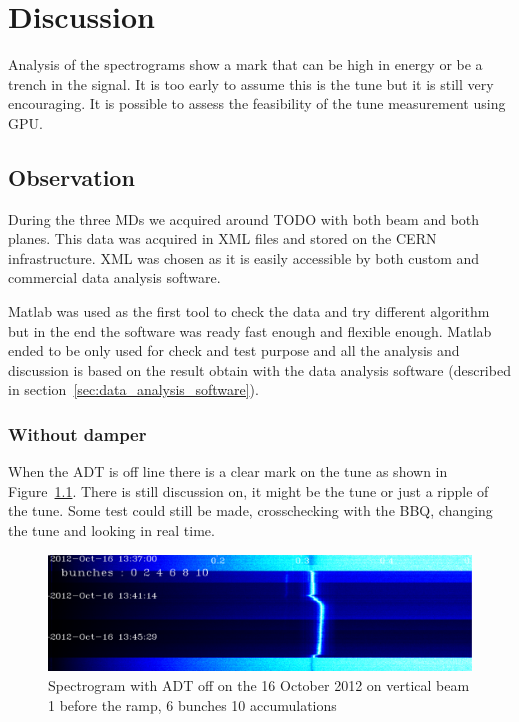 
\chapter{Discussion}

Analysis of the spectrograms show a mark that can be high in energy or be a trench in the signal. It is too early to assume this is the \gls{tune} but it is still very encouraging. It is possible to assess the feasibility of the tune measurement using \gls{GPU}.

\section{Observation}

During the three \glspl{MD} we acquired around TODO with both beam and both planes. This data was acquired in XML files and stored on the \gls{CERN} infrastructure. XML was chosen as it is easily accessible by both custom and commercial data analysis software.

Matlab was used as the first tool to check the data and try different algorithm but in the end the software was ready fast enough and flexible enough. Matlab ended to be only used for check and test purpose and all the analysis and discussion is based on the result obtain with the data analysis software (described in section~\ref{sec:data_analysis_software}).

\subsection{Without damper}

When the \gls{ADT} is off line there is a clear mark on the tune as shown in Figure~\ref{fig:adt_off}. There is still discussion on, it might be the tune or just a ripple of the tune. Some test could still be made, crosschecking with the \gls{BBQ}, changing the tune and looking in real time.

\begin{figure}[H]
\caption{Spectrogram with ADT off on the 16 October 2012 on vertical beam 1 before the ramp, 6 bunches 10 accumulations}
\label{fig:adt_off}
\centering
\includegraphics[scale=0.3]{md-121016-vb1-m1-6bunches-10acc-1337-1349-ADT-off.pdf}
\end{figure}

